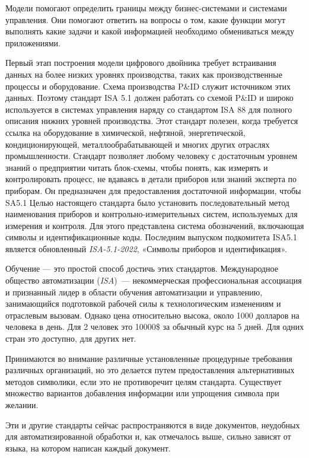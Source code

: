Модели помогают определить границы между бизнес-системами и системами управления. Они помогают ответить на вопросы о том, какие функции могут выполнять какие задачи и какой информацией необходимо обмениваться между приложениями.

Первый этап построения модели цифрового двойника требует встраивания данных на более низких уровнях производства, таких как производственные процессы и оборудование. Схема производства P\&ID служит источником этих данных. Поэтому стандарт ISA 5.1 \cite{ISA_5_1} должен работать со схемой P\&ID и широко используется в системах управления наряду со стандартом ISA 88 для полного описания нижних уровней производства. Этот стандарт полезен, когда требуется ссылка на оборудование в химической, нефтяной, энергетической, кондиционирующей, металлообрабатывающей и многих других отраслях промышленности. Стандарт позволяет любому человеку с достаточным уровнем знаний о предприятии читать блок-схемы, чтобы понять, как измерять и контролировать процесс, не вдаваясь в детали приборов или знаний эксперта по приборам. Он предназначен для предоставления достаточной информации, чтобы SA5.1 Целью настоящего стандарта было установить последовательный метод наименования приборов и контрольно-измерительных систем, используемых для измерения и контроля. Для этого представлена система обозначений, включающая символы и идентификационные коды. Последним выпуском подкомитета ISA5.1 является обновленный \textit {ISA-5.1-2022}, «Символы приборов и идентификация».

Обучение — это простой способ достичь этих стандартов. Международное общество автоматизации (\textit {ISA}) — некоммерческая профессиональная ассоциация и признанный лидер в области обучения автоматизации и управлению, занимающийся подготовкой рабочей силы к технологическим изменениям и отраслевым вызовам. Однако цена относительно высока, около 1000 долларов на человека в день. Для 2 человек это 10000\$ за обычный курс на 5 дней. Для одних стран это доступно, для других нет.

Принимаются во внимание различные установленные процедурные требования различных организаций, но это делается путем предоставления альтернативных методов символики, если это не противоречит целям стандарта. Существует множество вариантов добавления информации или упрощения символа при желании.

Эти и другие стандарты сейчас распространяются в виде документов, неудобных для автоматизированной обработки и, как отмечалось выше, сильно зависят от языка, на котором написан каждый документ.


